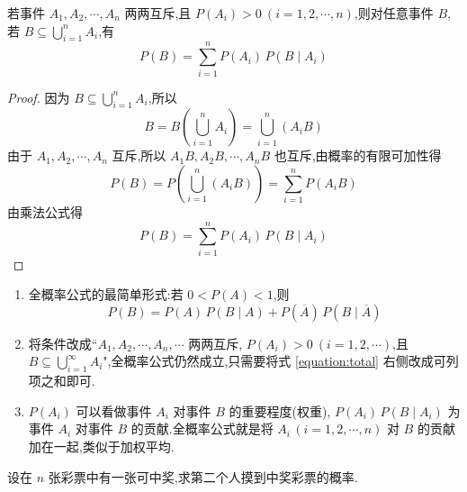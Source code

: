 \begin{theorem}[][全概率公式]
    \indent 若事件 $A_1,A_2,\cdots,A_n$ 两两互斥,且 $P(A_i)>0 \ (i=1,2,\cdots,n)$,则对任意事件 $B$,若 $B \subseteq \displaystyle\bigcup_{i=1}^n A_i$,有
    \begin{equation} \label{equation:total}
        P(B) = \sum_{i=1}^n P(A_i) \, P(B \mid A_i)
    \end{equation}
\end{theorem}

\begin{proof}
    因为 $B \subseteq \displaystyle\bigcup_{i=1}^n A_i$,所以
    $$
    B = B \left( \bigcup_{i=1}^n A_i \right) = \bigcup_{i=1}^n(A_i B)
    $$
    由于 $A_1,A_2,\cdots,A_n$ 互斥,所以 $A_1 B, A_2 B, \cdots, A_n B$ 也互斥,由概率的有限可加性得
    $$
    P(B) = P \left( \bigcup_{i=1}^n (A_i B) \right) = \sum_{i=1}^n P(A_i B)
    $$
    由乘法公式得
    $$
    P(B) = \sum_{i=1}^n P(A_i) \, P(B \mid A_i)
    $$

    \vspace{-2em}
\end{proof}

\begin{note}
    \begin{enumerate}
        \item 全概率公式的最简单形式:若 $0 < P(A) < 1$,则
        $$
        P(B) = P(A) \, P(B \mid A) + P(\overline{A}) \, P(B \mid \overline{A})
        $$
        \item 将条件改成``$A_1, A_2, \cdots, A_n, \cdots$ 两两互斥, $P(A_i)>0 \ (i=1,2,\cdots)$,且 $B \subseteq \displaystyle\bigcup_{i=1}^{\infty} A_i$",全概率公式仍然成立,只需要将式 \eqref{equation:total} 右侧改成可列项之和即可.
        \item $P(A_i)$ 可以看做事件 $A_i$ 对事件 $B$ 的重要程度(权重), $P(A_i) \, P(B \mid A_i)$ 为事件 $A_i$ 对事件 $B$ 的贡献.全概率公式就是将 $A_i \, (i=1,2,\cdots,n)$ 对 $B$ 的贡献加在一起,类似于加权平均.
    \end{enumerate}
\end{note}

\begin{example}
    \indent 设在 $n$ 张彩票中有一张可中奖,求第二个人摸到中奖彩票的概率.
\end{example}

